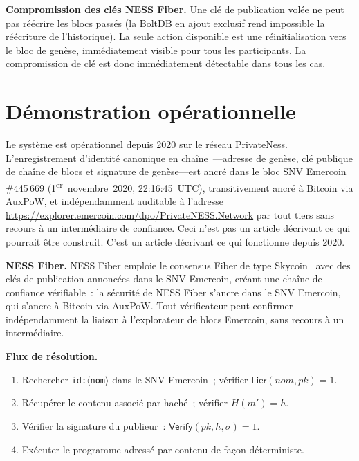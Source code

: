 \documentclass[11pt,a4paper]{article}
\begin{document}
\textbf{Compromission des clés NESS Fiber.}  Une clé de publication volée
ne peut pas réécrire les blocs passés (la BoltDB en ajout exclusif rend
impossible la réécriture de l'historique).  La seule action disponible est
une réinitialisation vers le bloc de genèse, immédiatement visible pour tous
les participants.  La compromission de clé est donc immédiatement détectable dans tous les cas.

\section{Démonstration opérationnelle}

Le système est opérationnel depuis 2020 sur le réseau PrivateNess.
L'enregistrement d'identité canonique en chaîne~\cite{onchain}---adresse de
genèse, clé publique de chaîne de blocs et signature de genèse---est ancré
dans le bloc SNV Emercoin \#445\,669 (1\textsuperscript{er}~novembre~2020,
22:16:45~UTC), transitivement ancré à Bitcoin via AuxPoW, et
indépendamment auditable à l'adresse
\url{https://explorer.emercoin.com/dpo/PrivateNESS.Network} par tout tiers
sans recours à un intermédiaire de confiance.  Ceci n'est pas un article
décrivant ce qui pourrait être construit.  C'est un article décrivant ce qui
fonctionne depuis 2020.

\textbf{NESS Fiber.}  NESS Fiber emploie le consensus Fiber de type
Skycoin~\cite{skycoin} avec des clés de publication annoncées dans le SNV
Emercoin, créant une chaîne de confiance vérifiable~: la sécurité de NESS
Fiber s'ancre dans le SNV Emercoin, qui s'ancre à Bitcoin via AuxPoW.  Tout
vérificateur peut confirmer indépendamment la liaison à l'explorateur de
blocs Emercoin, sans recours à un intermédiaire.

\textbf{Flux de résolution.}
\begin{enumerate}[leftmargin=*]
  \item Rechercher \texttt{id:$\langle$nom$\rangle$} dans le SNV Emercoin~;
    vérifier $\mathsf{Lier}(\mathit{nom}, pk) = 1$.
  \item Récupérer le contenu associé par haché~;
    vérifier $H(m') = h$.
  \item Vérifier la signature du publieur~:
    $\mathsf{Verify}(pk, h, \sigma) = 1$.
  \item Exécuter le programme adressé par contenu de façon déterministe.
\end{enumerate}
\end{document}
